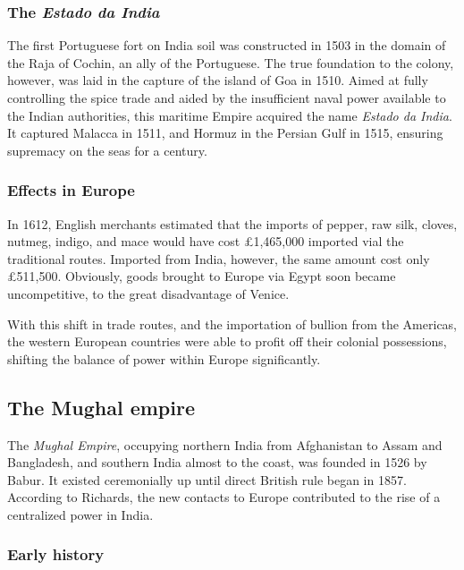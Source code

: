 \documentclass[11pt, a4paper, headings=standardclasses]{scrartcl}
\begin{document}
\subsubsection{The \textit{Estado da India}}

The first Portuguese fort on India soil was constructed in 1503 in the domain of the Raja of Cochin, an ally of the Portuguese.\autocite[383]{FT} The true foundation to the colony, however, was laid in the capture of the island of Goa in 1510. Aimed at fully controlling the spice trade and aided by the insufficient naval power available to the Indian authorities, this maritime Empire acquired the name \textit{Estado da India}. It captured Malacca in 1511, and Hormuz in the Persian Gulf in 1515, ensuring supremacy on the seas for a century.\autocite[382--383]{FT}

\subsubsection{Effects in Europe}

In 1612, English merchants estimated that the imports of pepper, raw silk, cloves, nutmeg, indigo, and mace would have cost \pounds{}1,465,000 imported vial the traditional routes. Imported from India, however, the same amount cost only \pounds{}511,500.\autocite[393]{RF} Obviously, goods brought to Europe via Egypt soon became uncompetitive, to the great disadvantage of Venice.

With this shift in trade routes, and the importation of bullion from the Americas, the western European countries were able to profit off their colonial possessions, shifting the balance of power within Europe significantly.\autocite{EIC}

\subsection{The Mughal empire}

The \emph{Mughal Empire}, occupying northern India from Afghanistan to Assam and Bangladesh, and southern India almost to the coast, was founded in 1526 by Babur. It existed ceremonially up until direct British rule began in 1857.
According to Richards, the new contacts to Europe contributed to the rise of a centralized power in India.\autocite[6]{richards}
\subsubsection{Early history}
\end{document}
